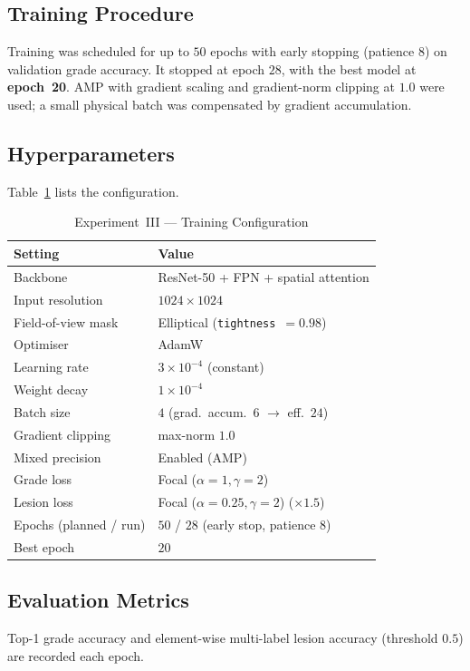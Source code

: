 \documentclass[journal,twoside,web]{ieeecolor}
\begin{document}
\subsection{Training Procedure}
Training was scheduled for up to $50$ epochs with early stopping (patience $8$) on
validation grade accuracy. It stopped at epoch $28$, with the best model at
\textbf{epoch~20}. AMP with gradient scaling and gradient-norm clipping at $1.0$
were used; a small physical batch was compensated by gradient accumulation.

\subsection{Hyperparameters}
Table~\ref{tab:exp3_hyper} lists the configuration.

\begin{table}[!t]
\caption{Experiment~III --- Training Configuration}
\label{tab:exp3_hyper}
\centering
\setlength{\tabcolsep}{5pt}
\begin{tabular}{|l|l|}
\hline
\textbf{Setting} & \textbf{Value} \\
\hline
Backbone & ResNet-50 + FPN + spatial attention \\
Input resolution & $1024\times1024$ \\
Field-of-view mask & Elliptical (\texttt{tightness}~$=0.98$) \\
Optimiser & AdamW \\
Learning rate & $3\times10^{-4}$ (constant) \\
Weight decay & $1\times10^{-4}$ \\
Batch size & $4$ (grad.\ accum.\ $6$ $\rightarrow$ eff.\ $24$) \\
Gradient clipping & max-norm $1.0$ \\
Mixed precision & Enabled (AMP) \\
Grade loss & Focal ($\alpha{=}1,\gamma{=}2$) \\
Lesion loss & Focal ($\alpha{=}0.25,\gamma{=}2$) ($\times1.5$) \\
Epochs (planned / run) & $50$ / $28$ (early stop, patience $8$) \\
Best epoch & $20$ \\
\hline
\end{tabular}
\end{table}

\subsection{Evaluation Metrics}
Top-1 grade accuracy and element-wise multi-label lesion accuracy (threshold
$0.5$) are recorded each epoch.
\end{document}
